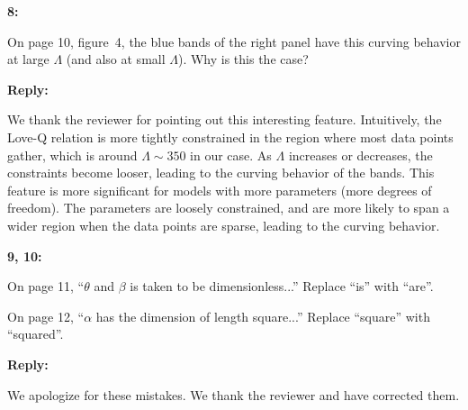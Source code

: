 \documentclass[11pt]{article}
\newenvironment{reviewercomment}[1]{
    \vspace{1em}
    \noindent \textbf{#1:} \itshape
}{
    \par\vspace{0.5em}
}
\newenvironment{authorresponse}{
    \noindent \textbf{Reply:} \normalfont
}{
    \par\vspace{1.5em}
}
\begin{document}
\begin{reviewercomment}{8}
    On page 10, figure~4, the blue bands of the right panel have this curving behavior at large $\Lambda$ (and also at small $\Lambda$). Why is this the case? 
\end{reviewercomment}

\begin{authorresponse}
    We thank the reviewer for pointing out this interesting feature.
    Intuitively, the Love-Q relation is more tightly constrained in the region
    where most data points gather, which is around $\Lambda \sim 350$ in our
    case. As $\Lambda$ increases or decreases, the constraints become looser,
    leading to the curving behavior of the bands. This feature is more
    significant for models with more parameters (more degrees of freedom). The
    parameters are loosely constrained, and are more likely to span a wider
    region when the data points are sparse, leading to the curving behavior.
\end{authorresponse}


\begin{reviewercomment}{9, 10}
    On page 11, ``$\theta$ and $\beta$ is taken to be dimensionless...'' Replace ``is'' with ``are''. 
    
    On page 12, ``$\alpha$ has the dimension of length square...'' Replace ``square'' with ``squared''.
\end{reviewercomment}

\begin{authorresponse}
    We apologize for these mistakes. We thank the reviewer and have corrected them.
\end{authorresponse}
\end{document}
